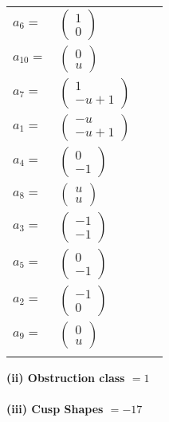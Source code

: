 \documentclass[1p]{elsarticle_modified}
\theoremstyle{definition}
\begin{document}
\begin{tabular}{m{7pt} m{180pt} m{7pt} m{180pt} }
\flushright $a_{6}=$&$\begin{pmatrix}1\\0\end{pmatrix}$ \\
\flushright $a_{10}=$&$\begin{pmatrix}0\\u\end{pmatrix}$ \\
\flushright $a_{7}=$&$\begin{pmatrix}1\\- u+1\end{pmatrix}$ \\
\flushright $a_{1}=$&$\begin{pmatrix}- u\\- u+1\end{pmatrix}$ \\
\flushright $a_{4}=$&$\begin{pmatrix}0\\-1\end{pmatrix}$ \\
\flushright $a_{8}=$&$\begin{pmatrix}u\\u\end{pmatrix}$ \\
\flushright $a_{3}=$&$\begin{pmatrix}-1\\-1\end{pmatrix}$ \\
\flushright $a_{5}=$&$\begin{pmatrix}0\\-1\end{pmatrix}$ \\
\flushright $a_{2}=$&$\begin{pmatrix}-1\\0\end{pmatrix}$ \\
\flushright $a_{9}=$&$\begin{pmatrix}0\\u\end{pmatrix}$\\&\end{tabular}
\flushleft \textbf{(ii) Obstruction class $= 1$}\\~\\
\flushleft \textbf{(iii) Cusp Shapes $= -17$}\\~\\
\end{document}
